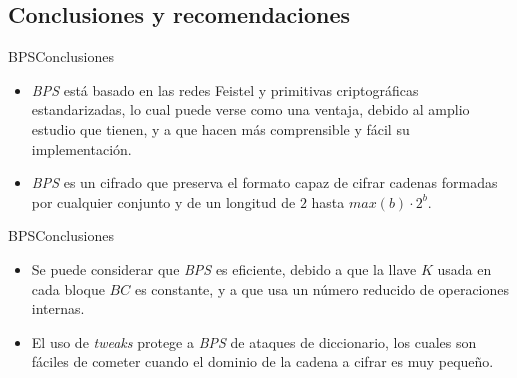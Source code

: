 %
%

\subsection{Conclusiones y recomendaciones}

\begin{frame}{BPS}{Conclusiones}

  \begin{itemize}
    \item \textit{BPS} está basado en las redes Feistel y primitivas 
      criptográficas estandarizadas, lo cual puede verse como una ventaja, 
      debido al amplio estudio que tienen, y a que hacen más comprensible 
      y fácil su implementación.
    
    \item \textit{BPS} es un cifrado que preserva el formato capaz de cifrar 
      cadenas formadas por cualquier conjunto y de un longitud de $2$ hasta 
      $max(b) \cdot 2^{b}$.
  \end{itemize}
  
\end{frame}

\begin{frame}{BPS}{Conclusiones}

  \begin{itemize}
    \item Se puede considerar que \textit{BPS} es eficiente, debido a que la 
      llave $K$ usada en cada bloque $BC$ es constante, y a que usa un número 
      reducido de operaciones internas.
    
    \item El uso de \textit{tweaks} protege a \textit{BPS} de ataques de
      diccionario, los cuales son fáciles de cometer cuando el dominio de la
      cadena a cifrar es muy pequeño.
  \end{itemize}
  
\end{frame}

